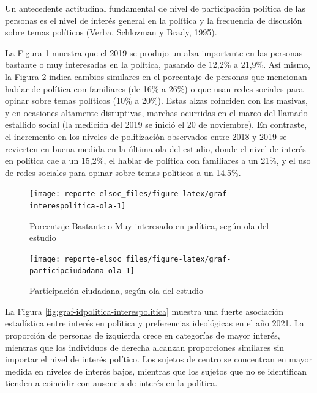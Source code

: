 \documentclass[
  12pt,
]{book}
\begin{document}
Un antecedente actitudinal fundamental de nivel de participación política de las personas es el nivel de interés general en la política y la frecuencia de discusión sobre temas políticos (Verba, Schlozman y Brady, 1995).

La Figura \ref{fig:graf-interespolitica-ola} muestra que el 2019 se produjo un alza importante en las personas bastante o muy interesadas en la política, pasando de 12,2\% a 21,9\%. Así mismo, la Figura \ref{fig:graf-participciudadana-ola} indica cambios similares en el porcentaje de personas que mencionan hablar de política con familiares (de 16\% a 26\%) o que usan redes sociales para opinar sobre temas políticos (10\% a 20\%). Estas alzas coinciden con las masivas, y en ocasiones altamente disruptivas, marchas ocurridas en el marco del llamado estallido social (la medición del 2019 se inició el 20 de noviembre). En contraste, el incremento en los niveles de politización observados entre 2018 y 2019 se revierten en buena medida en la última ola del estudio, donde el nivel de interés en política cae a un 15,2\%, el hablar de política con familiares a un 21\%, y el uso de redes sociales para opinar sobre temas políticos a un 14.5\%.

\begin{figure}

{\centering \texttt{[image: reporte-elsoc\_files/figure-latex/graf-interespolitica-ola-1]} 

}

\caption{Porcentaje Bastante o Muy interesado en política, según ola del estudio}\label{fig:graf-interespolitica-ola}
\end{figure}

\begin{figure}

{\centering \texttt{[image: reporte-elsoc\_files/figure-latex/graf-participciudadana-ola-1]} 

}

\caption{Participación ciudadana, según ola del estudio}\label{fig:graf-participciudadana-ola}
\end{figure}

La Figura \ref{fig:graf-idpolitica-interespolitica} muestra una fuerte asociación estadística entre interés en política y preferencias ideológicas en el año 2021. La proporción de personas de izquierda crece en categorías de mayor interés, mientras que los individuos de derecha alcanzan proporciones similares sin importar el nivel de interés político. Los sujetos de centro se concentran en mayor medida en niveles de interés bajos, mientras que los sujetos que no se identifican tienden a coincidir con ausencia de interés en la política.
\end{document}
